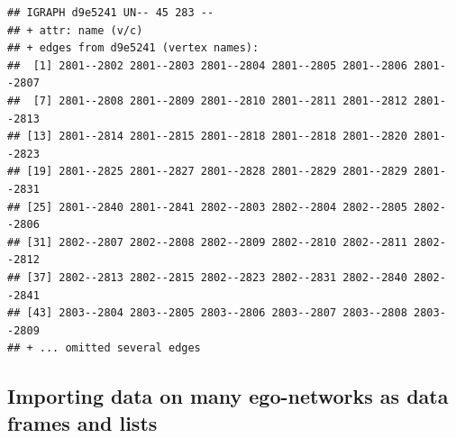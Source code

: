 \documentclass[
]{book}
\begin{document}
\begin{verbatim}
## IGRAPH d9e5241 UN-- 45 283 -- 
## + attr: name (v/c)
## + edges from d9e5241 (vertex names):
##  [1] 2801--2802 2801--2803 2801--2804 2801--2805 2801--2806 2801--2807
##  [7] 2801--2808 2801--2809 2801--2810 2801--2811 2801--2812 2801--2813
## [13] 2801--2814 2801--2815 2801--2818 2801--2818 2801--2820 2801--2823
## [19] 2801--2825 2801--2827 2801--2828 2801--2829 2801--2829 2801--2831
## [25] 2801--2840 2801--2841 2802--2803 2802--2804 2802--2805 2802--2806
## [31] 2802--2807 2802--2808 2802--2809 2802--2810 2802--2811 2802--2812
## [37] 2802--2813 2802--2815 2802--2823 2802--2831 2802--2840 2802--2841
## [43] 2803--2804 2803--2805 2803--2806 2803--2807 2803--2808 2803--2809
## + ... omitted several edges
\end{verbatim}

\hypertarget{importing-data-on-many-ego-networks-as-data-frames-and-lists}{%
\subsection{Importing data on many ego-networks as data frames and lists}\label{importing-data-on-many-ego-networks-as-data-frames-and-lists}}
\end{document}
